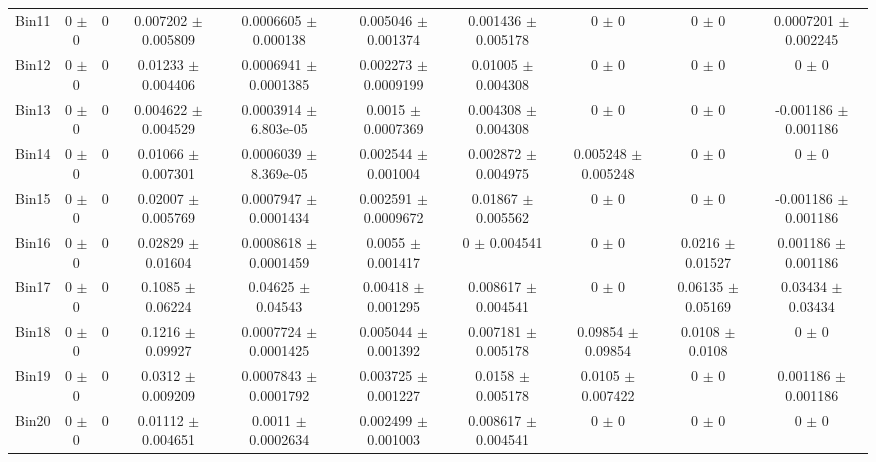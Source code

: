 \begin{tabular}{@{\extracolsep{4pt}}lccccccccc@{}}
     Bin11 & 0 $\pm$ 0 & 0 & 0.007202 $\pm$ 0.005809 & 0.0006605 $\pm$ 0.000138 & 0.005046 $\pm$ 0.001374 & 0.001436 $\pm$ 0.005178 & 0 $\pm$ 0 & 0 $\pm$ 0 & 0.0007201 $\pm$ 0.002245 \\ 
     Bin12 & 0 $\pm$ 0 & 0 & 0.01233 $\pm$ 0.004406 & 0.0006941 $\pm$ 0.0001385 & 0.002273 $\pm$ 0.0009199 & 0.01005 $\pm$ 0.004308 & 0 $\pm$ 0 & 0 $\pm$ 0 & 0 $\pm$ 0 \\ 
     Bin13 & 0 $\pm$ 0 & 0 & 0.004622 $\pm$ 0.004529 & 0.0003914 $\pm$ 6.803e-05 & 0.0015 $\pm$ 0.0007369 & 0.004308 $\pm$ 0.004308 & 0 $\pm$ 0 & 0 $\pm$ 0 & -0.001186 $\pm$ 0.001186 \\ 
     Bin14 & 0 $\pm$ 0 & 0 & 0.01066 $\pm$ 0.007301 & 0.0006039 $\pm$ 8.369e-05 & 0.002544 $\pm$ 0.001004 & 0.002872 $\pm$ 0.004975 & 0.005248 $\pm$ 0.005248 & 0 $\pm$ 0 & 0 $\pm$ 0 \\ 
     Bin15 & 0 $\pm$ 0 & 0 & 0.02007 $\pm$ 0.005769 & 0.0007947 $\pm$ 0.0001434 & 0.002591 $\pm$ 0.0009672 & 0.01867 $\pm$ 0.005562 & 0 $\pm$ 0 & 0 $\pm$ 0 & -0.001186 $\pm$ 0.001186 \\ 
     Bin16 & 0 $\pm$ 0 & 0 & 0.02829 $\pm$ 0.01604 & 0.0008618 $\pm$ 0.0001459 & 0.0055 $\pm$ 0.001417 & 0 $\pm$ 0.004541 & 0 $\pm$ 0 & 0.0216 $\pm$ 0.01527 & 0.001186 $\pm$ 0.001186 \\ 
     Bin17 & 0 $\pm$ 0 & 0 & 0.1085 $\pm$ 0.06224 & 0.04625 $\pm$ 0.04543 & 0.00418 $\pm$ 0.001295 & 0.008617 $\pm$ 0.004541 & 0 $\pm$ 0 & 0.06135 $\pm$ 0.05169 & 0.03434 $\pm$ 0.03434 \\ 
     Bin18 & 0 $\pm$ 0 & 0 & 0.1216 $\pm$ 0.09927 & 0.0007724 $\pm$ 0.0001425 & 0.005044 $\pm$ 0.001392 & 0.007181 $\pm$ 0.005178 & 0.09854 $\pm$ 0.09854 & 0.0108 $\pm$ 0.0108 & 0 $\pm$ 0 \\ 
     Bin19 & 0 $\pm$ 0 & 0 & 0.0312 $\pm$ 0.009209 & 0.0007843 $\pm$ 0.0001792 & 0.003725 $\pm$ 0.001227 & 0.0158 $\pm$ 0.005178 & 0.0105 $\pm$ 0.007422 & 0 $\pm$ 0 & 0.001186 $\pm$ 0.001186 \\ 
     Bin20 & 0 $\pm$ 0 & 0 & 0.01112 $\pm$ 0.004651 & 0.0011 $\pm$ 0.0002634 & 0.002499 $\pm$ 0.001003 & 0.008617 $\pm$ 0.004541 & 0 $\pm$ 0 & 0 $\pm$ 0 & 0 $\pm$ 0 \\ 
\hline\hline
  \end{tabular}
